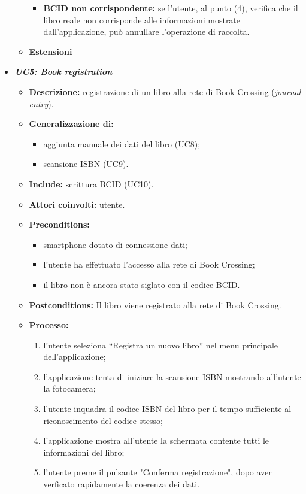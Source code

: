 \begin{itemize}
\begin{itemize}
\begin{itemize}
			\item \textbf{BCID non corrispondente:} se l'utente, al punto (4), verifica che il libro reale non corrisponde alle informazioni mostrate dall'applicazione, può annullare l'operazione di raccolta.
		\end{itemize}
		\item \textbf{Estensioni}
	\end{itemize}
	\item \textbf{\textit{UC5: Book registration}}
	\begin{itemize}
		\item \textbf{Descrizione:} registrazione di un libro alla rete di Book Crossing (\textit{journal entry}).
		\item \textbf{Generalizzazione di:} 
		\begin{itemize}
			\item aggiunta manuale dei dati del libro (UC8);
			\item scansione ISBN (UC9).
		\end{itemize}
		\item \textbf{Include:} scrittura BCID (UC10).
		\item \textbf{Attori coinvolti:} utente.
		\item \textbf{Preconditions:}
		\begin{itemize}
			\item smartphone dotato di connessione dati;
			\item l’utente ha effettuato l’accesso alla rete di Book Crossing;
			\item il libro non è ancora stato siglato con il codice BCID.
		\end{itemize}
		\item \textbf{Postconditions:} Il libro viene registrato alla rete di Book Crossing.		
		\item \textbf{Processo:} 
		\begin{enumerate}
			\item l’utente seleziona “Registra un nuovo libro” nel menu principale dell’applicazione;
			\item l’applicazione tenta di iniziare la scansione ISBN mostrando all'utente la fotocamera;
			\item l’utente inquadra il codice ISBN del libro per il tempo sufficiente al riconoscimento del codice stesso;
			\item l’applicazione mostra all'utente la schermata contente tutti le informazioni del libro; 
			\item l'utente preme il pulsante "Conferma registrazione", dopo aver verficato rapidamente la coerenza dei dati.

\end{enumerate}
\end{itemize}
\end{itemize}
